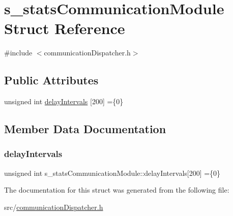 \hypertarget{structs__stats_communication_module}{}\section{s\+\_\+stats\+Communication\+Module Struct Reference}
\label{structs__stats_communication_module}


{\ttfamily \#include $<$communication\+Dispatcher.\+h$>$}

\subsection*{Public Attributes}
\begin{DoxyCompactItemize}
\item 
unsigned int \hyperlink{structs__stats_communication_module_a19c4cf28c1e3cd24e80398bbf5be89d6}{delay\+Intervals} \mbox{[}200\mbox{]} =\{0\}
\end{DoxyCompactItemize}


\subsection{Member Data Documentation}
\mbox{\label{structs__stats_communication_module_a19c4cf28c1e3cd24e80398bbf5be89d6}} 
\subsubsection{\texorpdfstring{delay\+Intervals}{delayIntervals}}
{\footnotesize\ttfamily unsigned int s\+\_\+stats\+Communication\+Module\+::delay\+Intervals\mbox{[}200\mbox{]} =\{0\}}



The documentation for this struct was generated from the following file\+:\begin{DoxyCompactItemize}
\item 
src/\hyperlink{communication_dispatcher_8h}{communication\+Dispatcher.\+h}\end{DoxyCompactItemize}
